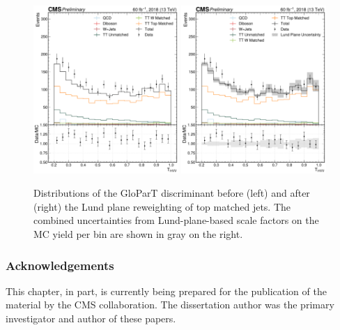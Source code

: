 \begin{figure}[hbt]
\centering
\includegraphics[width=0.49\textwidth]{figures/05-HH/part/pre_ak8FatJetParTMD_THWW4q-prelim.pdf}
\includegraphics[width=0.49\textwidth]{figures/05-HH/part/postlnN_ak8FatJetParTMD_THWW4q-prelim.pdf}
\caption[Distributions of the GloParT \THWW discriminant before and after the Lund plane reweighting of top matched jets.]{Distributions of the GloParT \THWW discriminant before (left) and after (right) the Lund plane reweighting of top matched jets.
The combined uncertainties from Lund-plane-based scale factors on the MC yield per bin are shown in gray on the right.
\label{fig:05_part_ttbar}
}
\end{figure}

\subsubsection{Acknowledgements}

This chapter, in part, is currently being prepared for the publication of the material by the CMS collaboration.
The dissertation author was the primary investigator and author of these papers.
